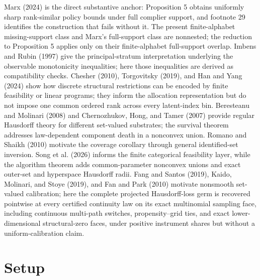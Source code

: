 \documentclass{article}
\begin{document}
Marx (2024) is the direct substantive anchor: Proposition 5 obtains uniformly sharp rank-similar policy bounds under full complier support, and footnote 29 identifies the construction that fails without it. The present finite-alphabet missing-support class and Marx's full-support class are nonnested; the reduction to Proposition 5 applies only on their finite-alphabet full-support overlap. Imbens and Rubin (1997) give the principal-stratum interpretation underlying the observable monotonicity inequalities; here those inequalities are derived as compatibility checks. Chesher (2010), Torgovitsky (2019), and Han and Yang (2024) show how discrete structural restrictions can be encoded by finite feasibility or linear programs; they inform the allocation representation but do not impose one common ordered rank across every latent-index bin. Beresteanu and Molinari (2008) and Chernozhukov, Hong, and Tamer (2007) provide regular Hausdorff theory for different set-valued substrates; the survival theorem addresses law-dependent component death in a nonconvex union. Romano and Shaikh (2010) motivate the coverage corollary through general identified-set inversion. Song et al. (2026) informs the finite categorical feasibility layer, while the algorithm theorem adds common-parameter nonconvex unions and exact outer-set and hyperspace Hausdorff radii. Fang and Santos (2019), Kaido, Molinari, and Stoye (2019), and Fan and Park (2010) motivate nonsmooth set-valued calibration; here the complete projected Hausdorff-loss germ is recovered pointwise at every certified continuity law on its exact multinomial sampling face, including continuous multi-path switches, propensity--grid ties, and exact lower-dimensional structural-zero faces, under positive instrument shares but without a uniform-calibration claim.

\section{Setup}
\end{document}
